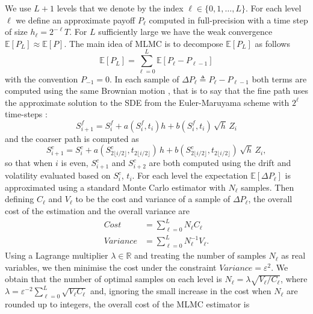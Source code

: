 We use $L+1$ levels that we denote by the index $\ell\in\{0,1, \ldots, L\}$. For each level $\ell$ we define an approximate payoff $P_\ell$ computed in full-precision with a time step of size $h_\ell = 2^{-\ell} T$. For $L$ sufficiently large we have the weak convergence $\mathbb{E}[P_L] \approx \mathbb{E}[P]$. The main idea of MLMC is to decompose $\mathbb{E}[P_L]$ as follows
\begin{equation} \label{classic_MLMC_iden}
    \mathbb{E}[P_L]=\sum_{\ell=0}^L \mathbb{E}[P_\ell-P_{\ell-1}]
\end{equation}
with the convention $P_{-1}=0$. In each sample of $\Delta P_\ell \triangleq P_\ell-P_{\ell-1}$ both terms are computed using the same Brownian motion \cite{Giles_overview17,NestedOliver}, that is to say that the fine path uses the approximate solution to the SDE from the Euler-Maruyama scheme with $2^\ell$ time-steps :
\begin{equation}
    S^{f}_{i+1} = S^{f}_{i} + a(S^{f}_{i}, t_i) h + b(S^{f}_{i},t_i) \, \sqrt{h}\, Z_i
\end{equation}
and the coarser path is computed as
\begin{equation}
    S^{c}_{i+1} = S^{c}_{i} + a(S^{c}_{2\lfloor i/2\rfloor}, t_{2\lfloor i/2\rfloor})\, h + b(S^{c}_{2\lfloor i/2\rfloor},t_{2\lfloor i/2\rfloor})\, \sqrt{h} \, Z_i,
\end{equation}
so that when $i$ is even, $S^{c}_{i+1}$ and $S^{c}_{i+2}$ are both computed using the drift and volatility evaluated based on $S^{c}_{i}$, $t_i$.
For each level the expectation $\mathbb{E}[\Delta P_\ell]$ is approximated using a standard Monte Carlo estimator with $N_\ell$ samples. 
Then defining %
$C_\ell$ and $V_\ell$ to be the cost and variance of a sample of $\Delta P_\ell$, the overall cost of the estimation and the overall variance are 
\begin{align}
    Cost &= \sum_{\ell=0}^L N_\ell C_\ell \\
    Variance &= \sum_{\ell=0}^L N_\ell^{-1} V_\ell.
\end{align}
Using a Lagrange multiplier $\lambda\in \mathbb{R}$ and treating the number of samples $N_{\ell}$ as real variables, we then minimise the cost under the constraint $Variance = \varepsilon^2$. We obtain that the number of optimal samples on each level is $N_\ell = \lambda \sqrt{V_\ell/C_\ell}$, where $\lambda = \varepsilon^{-2} \sum_{\ell=0}^L \sqrt{V_\ell C_\ell}$ and, ignoring the small increase in the cost when $N_\ell$ are rounded up to integers, the overall cost of the MLMC estimator is
